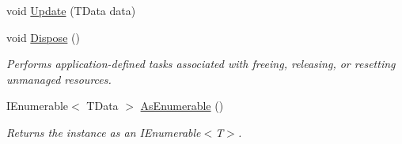 \begin{DoxyCompactItemize}
void \hyperlink{classCqrs_1_1Azure_1_1DocumentDb_1_1DataStores_1_1AzureDocumentDbDataStore_a55f504ed5094e3041a266b958424b1a2}{Update} (T\+Data data)
\item 
void \hyperlink{classCqrs_1_1Azure_1_1DocumentDb_1_1DataStores_1_1AzureDocumentDbDataStore_ade945ac02451a490711367dbe54d4132}{Dispose} ()
\begin{DoxyCompactList}\small\item\em Performs application-\/defined tasks associated with freeing, releasing, or resetting unmanaged resources. \end{DoxyCompactList}\item 
I\+Enumerable$<$ T\+Data $>$ \hyperlink{classCqrs_1_1Azure_1_1DocumentDb_1_1DataStores_1_1AzureDocumentDbDataStore_acbe24a7d0def44ca4826bbf5658a6054}{As\+Enumerable} ()
\begin{DoxyCompactList}\small\item\em Returns the instance as an I\+Enumerable$<$\+T$>$. \end{DoxyCompactList}\end{DoxyCompactItemize}
